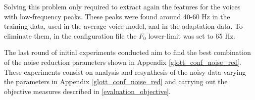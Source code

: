 Solving this problem only required to extract again the features for the voices with low-frequency peaks.
%
These peaks were found around 40-60 Hz in the training data, used in the average voice model, and in the adaptation data.
%
To eliminate them, in the configuration file the $F_{0}$ lower-limit was set to 65 Hz.

The last round of initial experiments conducted aim to find the best combination of the noise reduction parameters shown in Appendix \ref{glott_conf_noise_red}.
%
These experiments consist on analysis and resynthesis of the noisy data varying the parameters in Appendix \ref{glott_conf_noise_red} and carrying out the objective measures described in \ref{evaluation_objective}.
%
